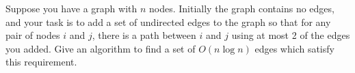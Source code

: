 \problem{}
Suppose you have a graph with $n$ nodes.  Initially the graph contains no edges, and your task is to add a set of undirected edges to the graph so that for any pair of nodes $i$ and $j$, there is a path between $i$ and $j$ using at most 2 of the edges you added.  Give an algorithm to find a set of $O(n \log n)$ edges which satisfy this requirement.  

\solution{

}

\newpage
